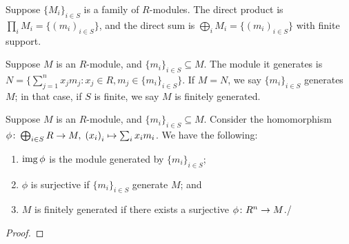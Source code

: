 \begin{definition}
    Suppose \({\{M_i\}}_{i \in S}\) is a family of \(R\)-modules.
    The direct product is \(\prod_i M_i = \{{(m_i)}_{i \in S}\}\),
    and the direct sum is \(\bigoplus_i M_i = \{{(m_i)_{i \in S}}\}\) with finite support.
\end{definition}

\begin{definition}
    Suppose \(M\) is an \(R\)-module, and \({\{m_i\}}_{i \in S} \subseteq M\).
    The module it generates is \(N = \{\sum_{j=1}^n x_j m_j : x_j \in R, m_j \in {\{m_i\}}_{i \in S}\}\).
    If \(M = N\), we say \({\{m_i\}}_{i \in S}\) generates \(M\);
    in that case, if \(S\) is finite, we say \(M\) is finitely generated.
\end{definition}
\begin{proposition}
    Suppose \(M\) is an \(R\)-module, and \({\{m_i\}}_{i \in S} \subseteq M\).
    Consider the homomorphism \(\phi\colon\bigoplus_{i \in S} R\to M,\;{(x_i)}_i\mapsto\sum_i x_i m_i\).
    We have the following:
    \begin{enumerate}[label={(\alph*)}, itemsep=0mm]
        \item \(\operatorname{img}\phi\) is the module generated by \({\{m_i\}}_{i \in S}\);
        \item \(\phi\) is surjective if \({\{m_i\}}_{i \in S}\) generate \(M\); and
        \item \(M\) is finitely generated if there exists a surjective \(\phi\colon R^n\to M\)./
    \end{enumerate}
\end{proposition}
\begin{proof}
    
\end{proof}

